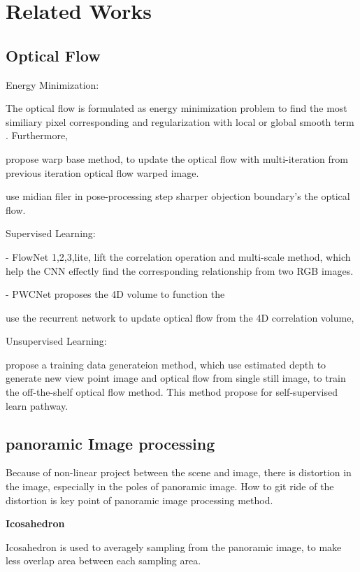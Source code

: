 \section{Related Works}


\subsection{Optical Flow}

Energy Minimization:

The optical flow is formulated as energy minimization problem to find the most similiary pixel corresponding and regularization with local or global smooth term \cite{DIS, HS, BA}. Furthermore, 

\cite{Borx} propose warp base method, to update the optical flow with multi-iteration from previous iteration optical flow warped image.

\cite{sun} use midian filer in pose-processing step sharper objection boundary's the optical flow.

Supervised Learning:

- FlowNet 1,2,3,lite, lift the correlation operation and multi-scale method, which help the CNN effectly find the corresponding relationship from two RGB images. 

- PWCNet proposes the 4D volume to function the 

\cite{teed2020raft} use the recurrent network to update optical flow from the 4D correlation volume, 

Unsupervised Learning:

\cite{aleotti2021learning} propose a training data generateion method, 
which use estimated depth to generate new view point image and optical flow from single still image, to train the off-the-shelf optical flow method.
This method propose for self-supervised learn pathway.

\subsection{panoramic Image processing}

Because of non-linear project between the scene and image, there is distortion in the image, especially in the poles of panoramic image.
How to git ride of the distortion is key point of panoramic image processing method. 

\textbf{Icosahedron}

Icosahedron is used to averagely sampling from the panoramic image, to make less overlap area between each sampling area.

